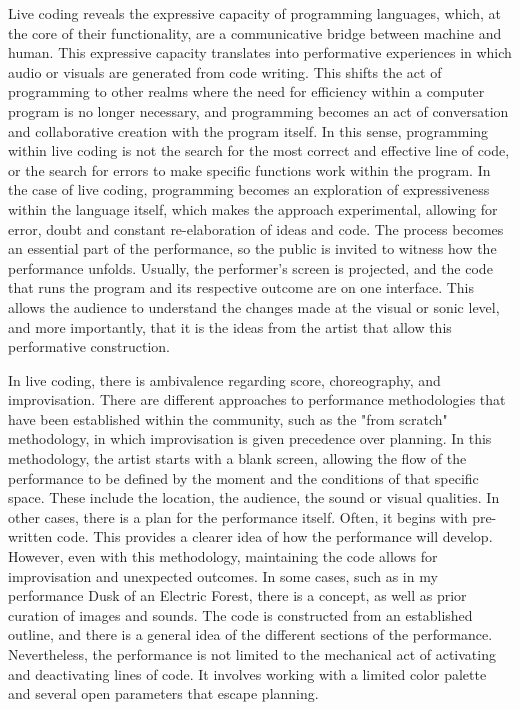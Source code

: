 \documentclass[12pt, twoside, a4paper]{report}
\begin{document}
Live coding reveals the expressive capacity of programming languages, which, at the core of their functionality, are a communicative bridge between machine and human. This expressive capacity translates into performative experiences in which audio or visuals are generated from code writing. This shifts the act of programming to other realms where the need for efficiency within a computer program is no longer necessary, and programming becomes an act of conversation and collaborative creation with the program itself. In this sense, programming within live coding is not the search for the most correct and effective line of code, or the search for errors to make specific functions work within the program. In the case of live coding, programming becomes an exploration of expressiveness within the language itself, which makes the approach experimental, allowing for error, doubt and constant re-elaboration of ideas and code. The process becomes an essential part of the performance, so the public is invited to witness how the performance unfolds. Usually, the performer's screen is projected, and the code that runs the program and its respective outcome are on one interface.  This allows the audience to understand the changes made at the visual or sonic level, and more importantly, that it is the  ideas from the artist that allow this performative construction.


In live coding, there is ambivalence regarding score, choreography, and improvisation. There are different approaches to performance methodologies that have been established within the community, such as the "from scratch" methodology, in which improvisation is given precedence over planning. In this methodology, the artist starts with a blank screen, allowing the flow of the performance to be defined by the moment and the conditions of that specific space. These include the location, the audience, the sound or visual qualities. In other cases, there is a plan for the performance itself. Often, it begins with pre-written code. This provides a clearer idea of how the performance will develop. However, even with this methodology, maintaining the code allows for improvisation and unexpected outcomes. In some cases, such as in my performance Dusk of an Electric Forest, there is a concept, as well as prior curation of images and sounds. The code is constructed from an established outline, and there is a general idea of the different sections of the performance. Nevertheless, the performance is not limited to the mechanical act of activating and deactivating lines of code. It involves working with a limited color palette and several open parameters that escape planning. 
\end{document}
